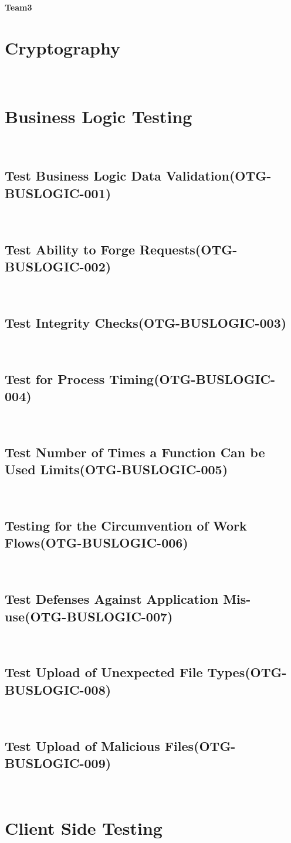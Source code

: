 \documentclass[headsepline,footsepline,footinclude=false,oneside,fontsize=11pt,paper=a4,listof=totoc,bibliography=totoc]{scrbook} %
\begin{document}
\textbf{Team3}\\


\section{Cryptography}\
 
\pagebreak 
\section{Business Logic Testing}\
\subsection{Test Business Logic Data Validation(OTG-BUSLOGIC-001)}\
\pagebreak 
\subsection{Test Ability to Forge Requests(OTG-BUSLOGIC-002)}\
\pagebreak 
\subsection{Test Integrity Checks(OTG-BUSLOGIC-003)}\
\pagebreak 
\subsection{Test for Process Timing(OTG-BUSLOGIC-004)}\
\pagebreak 
\subsection{Test Number of Times a Function Can be Used Limits(OTG-BUSLOGIC-005)}\
\pagebreak 
\subsection{Testing for the Circumvention of Work Flows(OTG-BUSLOGIC-006)}\
\pagebreak 
\subsection{Test Defenses Against Application Mis-use(OTG-BUSLOGIC-007)}\
\pagebreak 
\subsection{Test Upload of Unexpected File Types(OTG-BUSLOGIC-008)}\
\pagebreak 
\subsection{Test Upload of Malicious Files(OTG-BUSLOGIC-009)}\


\section{Client Side Testing}




\appendix{}

\glsaddall{} %
\printglossaries{}

\printbibliography{}
\end{document}
